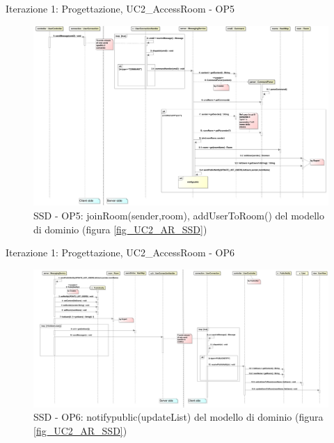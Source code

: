\begin{frame} {Iterazione 1: Progettazione, UC2\_AccessRoom - OP5}
   \begin{figure}
     \includegraphics[scale=0.09]{image_astah/Iteration_1_DesignModel/UC2_AccessRoom_SSD_5_join_add.png}{\centering}
     \caption{SSD - OP5: joinRoom(sender,room), addUserToRoom() del modello di dominio (figura \ref{fig_UC2_AR_SSD}) }
     \label{fig_UC2_SSD_AC_5} 
   \end{figure}
\end{frame}

\begin{frame} {Iterazione 1: Progettazione, UC2\_AccessRoom - OP6}
   \begin{figure}
     \includegraphics[scale=0.09]{image_astah/Iteration_1_DesignModel/UC2_AccessRoom_SSD_6_notifypublic.png}{\centering}
     \caption{SSD - OP6: notifypublic(updateList) del modello di dominio (figura \ref{fig_UC2_AR_SSD}) }
     \label{fig_UC2_SSD_AC_6} 
   \end{figure}
\end{frame}

